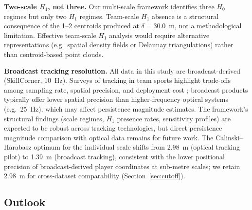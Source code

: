 \textbf{Two-scale \(H_1\), not three.} Our multi-scale framework identifies three \(H_0\) regimes but only two \(H_1\) regimes. Team-scale \(H_1\) absence is a structural consequence of the 1--2 centroids produced at \(\delta=30.0\)~m, not a methodological limitation. Effective team-scale \(H_1\) analysis would require alternative representations (e.g.\ spatial density fields or Delaunay triangulations) rather than centroid-based point clouds.

\textbf{Broadcast tracking resolution.} All data in this study are broadcast-derived (SkillCorner, 10~Hz). Surveys of tracking in team sports highlight trade-offs among sampling rate, spatial precision, and deployment cost \citep{Cummins2013, Aughey2011}; broadcast products typically offer lower spatial precision than higher-frequency optical systems (e.g.\ 25~Hz), which may affect persistence magnitude estimates. The framework's structural findings (scale regimes, $H_1$ presence rates, sensitivity profiles) are expected to be robust across tracking technologies, but direct persistence magnitude comparison with optical data remains for future work. The Calinski--Harabasz optimum for the individual scale shifts from 2.98~m (optical tracking pilot) to 1.39~m (broadcast tracking), consistent with the lower positional precision of broadcast-derived player coordinates at sub-metre scales; we retain 2.98~m for cross-dataset comparability (Section~\ref{sec:cutoff}).

\subsection{Outlook}
\label{sec:outlook}

